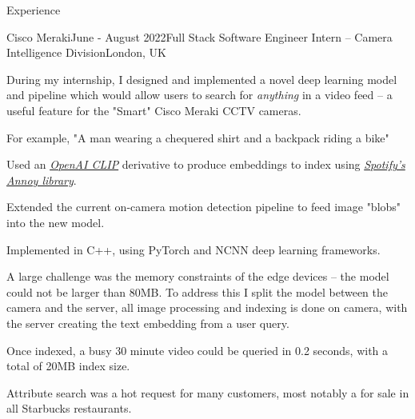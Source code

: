\documentclass{structure}
\begin{document}
\begin{rSection}{Experience}

    \begin{rSubsection}{Cisco Meraki}{June - August 2022}{Full Stack Software Engineer Intern -- Camera Intelligence Division}{London, UK}{}
        \item During my internship, I designed and implemented a novel deep learning model and pipeline which would allow users
        to search for \emph{anything} in a video feed -- a useful feature for the "Smart" Cisco Meraki CCTV cameras.
        \item For example, "A man wearing a chequered shirt and a backpack riding a bike"
        \item Used an \emph{\href{https://openai.com/blog/clip/}{OpenAI CLIP}} derivative to produce embeddings
        to index using \emph{\href{https://github.com/spotify/annoy}{Spotify's Annoy library}}.
        \item Extended the current on-camera motion detection pipeline to feed image "blobs" into the new model.
        \item Implemented in C++, using PyTorch and NCNN deep learning frameworks.
        \item A large challenge was the memory constraints of the edge devices -- the model could not be larger than 80MB.
        To address this I split the model between the camera and the server,
        all image processing and indexing is done on camera, with the server creating the text embedding from a user query.
        \item Once indexed, a busy 30 minute video could be queried in 0.2 seconds, with a total of 20MB index size.
        \item Attribute search was a hot request for many customers, most notably a for sale in all Starbucks restaurants.
        \item \href{https://gist.githubusercontent.com/tom-pollak/1a2e8c1fc61ba269e25c73c02c78007c/raw/45c8cbceda8cd745d6d00cb16a09979778df663b/gistfile1.txt}{\color{blue}{Project Reference}}
    \end{rSubsection}

\end{rSection}

\end{document}
